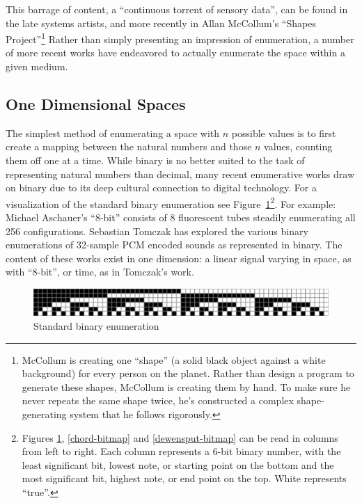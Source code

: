 \documentclass{thesis}
\begin{document}
This barrage of content, a ``continuous torrent of sensory data'', can be found in the late systems artists\cite{Wright09}, and more recently in Allan McCollum's ``Shapes Project''\cite{allan_mccollum_shapes_2006}\footnote{McCollum is creating one ``shape'' (a solid black object against a white background) for every person on the planet. Rather than design a program to generate these shapes, McCollum is creating them by hand. To make sure he never repeats the same shape twice, he's constructed a complex shape-generating system that he follows rigorously.} Rather than simply presenting an impression of enumeration, a number of more recent works have endeavored to actually enumerate the space within a given medium.

\subsection{One Dimensional Spaces}

The simplest method of enumerating a space with $n$ possible values is to first create a mapping between the natural numbers and those $n$ values, counting them off one at a time. While binary is no better suited to the task of representing natural numbers than decimal, many recent enumerative works draw on binary due to its deep cultural connection to digital technology. For a visualization of the standard binary enumeration see Figure~\ref{binary-bitmap}\footnote{Figures \ref{binary-bitmap}, \ref{chord-bitmap} and \ref{dewensput-bitmap} can be read in columns from left to right. Each column represents a 6-bit binary number, with the least significant bit, lowest note, or starting point on the bottom and the most significant bit, highest note, or end point on the top. White represents ``true''.}. For example: Michael Aschauer's ``8-bit''\cite{michael_aschauer_8-bit_????} consists of 8 fluorescent tubes steadily enumerating all 256 configurations. Sebastian Tomczak\cite{tomczak_hardware-based_2009}\cite{tomczak_all_2009} has explored the various binary enumerations of 32-sample PCM encoded sounds as represented in binary. The content of these works exist in one dimension: a linear signal varying in space, as with ``8-bit'', or time, as in Tomczak's work.

\begin{figure}
	\begin{center}
		\includegraphics[scale=.8]{graphics/binary-bitmap.pdf}
		\caption{Standard binary enumeration}
		\label{binary-bitmap}
	\end{center}
\end{figure}
\end{document}
